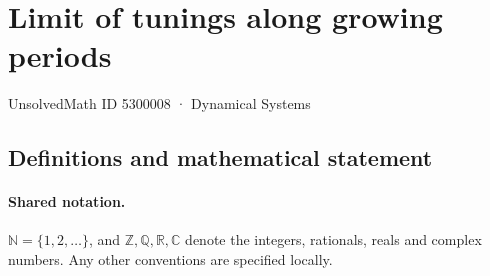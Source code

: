 \documentclass[11pt]{article}
\begin{document}
\setcounter{section}{5300007}
\section{Limit of tunings along growing periods}\label{5300008}
{\small\sffamily UnsolvedMath ID 5300008 · Dynamical Systems}
\subsection{Definitions and mathematical statement}

\paragraph{Shared notation.}$\mathbb N=\{1,2,\ldots\}$, and $\mathbb Z,\mathbb Q,\mathbb R,\mathbb C$ denote the integers, rationals, reals and complex numbers. Any other conventions are specified locally.
\end{document}
